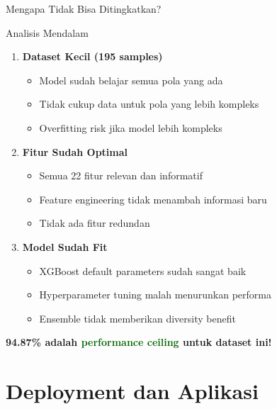 \documentclass[aspectratio=169]{beamer}
\begin{document}
\begin{frame}{Mengapa Tidak Bisa Ditingkatkan?}
\begin{block}{Analisis Mendalam}
\begin{enumerate}
    \item \textbf{Dataset Kecil (195 samples)}
    \begin{itemize}
        \item Model sudah belajar semua pola yang ada
        \item Tidak cukup data untuk pola yang lebih kompleks
        \item Overfitting risk jika model lebih kompleks
    \end{itemize}
    
    \item \textbf{Fitur Sudah Optimal}
    \begin{itemize}
        \item Semua 22 fitur relevan dan informatif
        \item Feature engineering tidak menambah informasi baru
        \item Tidak ada fitur redundan
    \end{itemize}
    
    \item \textbf{Model Sudah Fit}
    \begin{itemize}
        \item XGBoost default parameters sudah sangat baik
        \item Hyperparameter tuning malah menurunkan performa
        \item Ensemble tidak memberikan diversity benefit
    \end{itemize}
\end{enumerate}
\end{block}

\begin{center}
\textbf{94.87\% adalah \textcolor{darkgreen}{performance ceiling} untuk dataset ini!}
\end{center}
\end{frame}

\section{Deployment dan Aplikasi}
\end{document}
